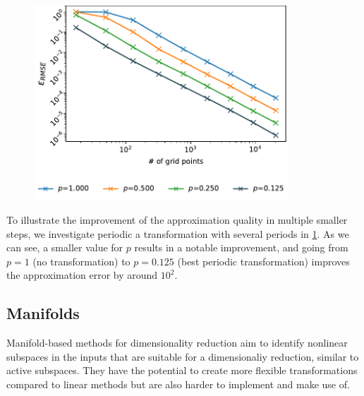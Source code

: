 \documentclass[
  a4paper,  %
  twoside,  %
  bibliography=totoc,
  headsepline,
  cleardoublepage=empty,
  parskip=half,
  draft=false
]{scrbook}
\begin{document}
\begin{mdframed}[style=style]
\vspace{2mm}
\begin{figure}[H]
        \centering
\begin{minipage}{.4\textwidth}
        \centering
\label{fig:periodic}
    \end{minipage}%
    \begin{minipage}{0.6\textwidth}
        \centering
\includegraphics[width=0.85\textwidth]{graphics/periodic}
    \end{minipage}
\end{figure}
\end{mdframed}
%
To illustrate the improvement of the approximation quality in multiple smaller steps, we investigate periodic a transformation with several periods in \cref{fig:periodic}.
As we can see, a smaller value for $p$ results in a notable improvement, and going from $p=1$ (no transformation) to $p=0.125$ (best periodic transformation) improves the approximation error by around $10^2$.

\subsection{Manifolds}

Manifold-based methods for dimensionality reduction aim to identify nonlinear subspaces in the inputs that are suitable for a dimensionaliy reduction, similar to active subspaces.
They have the potential to create more flexible transformations compared to linear methods but are also harder to implement and make use of.
\end{document}
